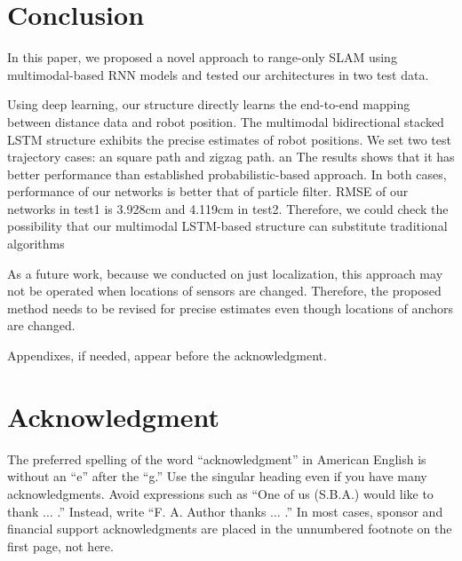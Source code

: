 \documentclass{ieeeaccess}
\begin{document}
\section{Conclusion}

In this paper, we proposed a novel approach to range-only SLAM using multimodal-based RNN models and tested our architectures in two test data.

Using deep learning, our structure directly learns the end-to-end mapping between distance data and robot position. The multimodal bidirectional stacked LSTM structure exhibits the precise estimates of robot positions. We set two test trajectory cases: an square path and zigzag path. an The results shows that it has better performance than established probabilistic-based approach. In both cases, performance of our networks  is better that of particle filter. RMSE of our networks in test1 is 3.928cm and 4.119cm in test2. Therefore, we could check the possibility that our multimodal LSTM-based structure can substitute traditional algorithms

As a future work, because we conducted on just localization, this approach may not be operated when locations of sensors are changed. Therefore, the proposed method needs to be revised for precise estimates even though locations of anchors are changed. 

\appendices

Appendixes, if needed, appear before the acknowledgment.

\section*{Acknowledgment}

The preferred spelling of the word ``acknowledgment'' in American English is 
without an ``e'' after the ``g.'' Use the singular heading even if you have 
many acknowledgments. Avoid expressions such as ``One of us (S.B.A.) would 
like to thank $\ldots$ .'' Instead, write ``F. A. Author thanks $\ldots$ .'' In most 
cases, sponsor and financial support acknowledgments are placed in the 
unnumbered footnote on the first page, not here.




\end{document}

